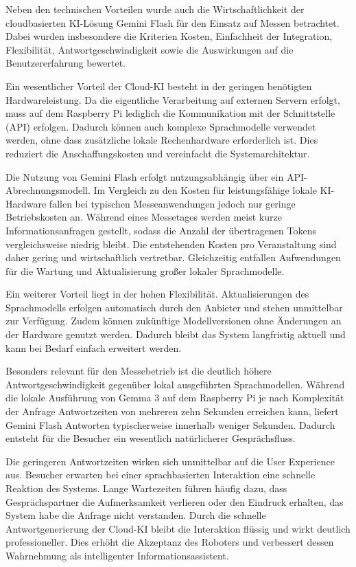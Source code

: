 Neben den technischen Vorteilen wurde auch die Wirtschaftlichkeit der cloudbasierten KI-Lösung Gemini Flash für den Einsatz auf Messen betrachtet. Dabei wurden insbesondere die Kriterien Kosten, Einfachheit der Integration, Flexibilität, Antwortgeschwindigkeit sowie die Auswirkungen auf die Benutzererfahrung bewertet.

Ein wesentlicher Vorteil der Cloud-KI besteht in der geringen benötigten Hardwareleistung. Da die eigentliche Verarbeitung auf externen Servern erfolgt, muss auf dem Raspberry Pi lediglich die Kommunikation mit der Schnittstelle (API) erfolgen. Dadurch können auch komplexe Sprachmodelle verwendet werden, ohne dass zusätzliche lokale Rechenhardware erforderlich ist. Dies reduziert die Anschaffungskosten und vereinfacht die Systemarchitektur.

Die Nutzung von Gemini Flash erfolgt nutzungsabhängig über ein API-Abrechnungsmodell. Im Vergleich zu den Kosten für leistungsfähige lokale KI-Hardware fallen bei typischen Messeanwendungen jedoch nur geringe Betriebskosten an. Während eines Messetages werden meist kurze Informationsanfragen gestellt, sodass die Anzahl der übertragenen Tokens vergleichsweise niedrig bleibt. Die entstehenden Kosten pro Veranstaltung sind daher gering und wirtschaftlich vertretbar. Gleichzeitig entfallen Aufwendungen für die Wartung und Aktualisierung großer lokaler Sprachmodelle.

Ein weiterer Vorteil liegt in der hohen Flexibilität. Aktualisierungen des Sprachmodells erfolgen automatisch durch den Anbieter und stehen unmittelbar zur Verfügung. Zudem können zukünftige Modellversionen ohne Änderungen an der Hardware genutzt werden. Dadurch bleibt das System langfristig aktuell und kann bei Bedarf einfach erweitert werden.

Besonders relevant für den Messebetrieb ist die deutlich höhere Antwortgeschwindigkeit gegenüber lokal ausgeführten Sprachmodellen. Während die lokale Ausführung von Gemma 3 auf dem Raspberry Pi je nach Komplexität der Anfrage Antwortzeiten von mehreren zehn Sekunden erreichen kann, liefert Gemini Flash Antworten typischerweise innerhalb weniger Sekunden. Dadurch entsteht für die Besucher ein wesentlich natürlicherer Gesprächsfluss.

Die geringeren Antwortzeiten wirken sich unmittelbar auf die User Experience aus. Besucher erwarten bei einer sprachbasierten Interaktion eine schnelle Reaktion des Systems. Lange Wartezeiten führen häufig dazu, dass Gesprächspartner die Aufmerksamkeit verlieren oder den Eindruck erhalten, das System habe die Anfrage nicht verstanden. Durch die schnelle Antwortgenerierung der Cloud-KI bleibt die Interaktion flüssig und wirkt deutlich professioneller. Dies erhöht die Akzeptanz des Roboters und verbessert dessen Wahrnehmung als intelligenter Informationsassistent.

